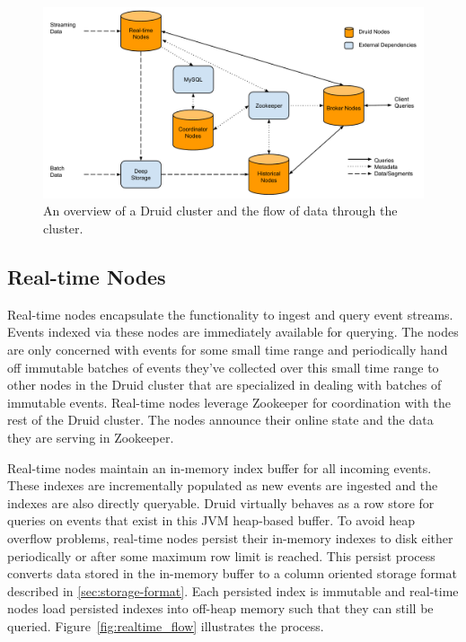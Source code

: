 \documentclass{acm_proc_article-sp}
\begin{document}
\begin{figure}
\centering
\includegraphics[width = 4.5in]{cluster}
\caption{An overview of a Druid cluster and the flow of data through the cluster.}
\label{fig:cluster}
\end{figure}

\subsection{Real-time Nodes}
\label{sec:realtime}
Real-time nodes encapsulate the functionality to ingest and query event
streams. Events indexed via these nodes are immediately available for querying.
The nodes are only concerned with events for some small time range and
periodically hand off immutable batches of events they've collected over this
small time range to other nodes in the Druid cluster that are specialized in
dealing with batches of immutable events. Real-time nodes leverage Zookeeper
\cite{hunt2010zookeeper} for coordination with the rest of the Druid cluster.
The nodes announce their online state and the data they are serving in
Zookeeper. 

Real-time nodes maintain an in-memory index buffer for all incoming events.
These indexes are incrementally populated as new events are ingested and the
indexes are also directly queryable.  Druid virtually behaves as a row store
for queries on events that exist in this JVM heap-based buffer. To avoid heap overflow
problems, real-time nodes persist their in-memory indexes to disk either
periodically or after some maximum row limit is reached. This persist process
converts data stored in the in-memory buffer to a column oriented storage
format described in \ref{sec:storage-format}. Each persisted index is immutable and
real-time nodes load persisted indexes into off-heap memory such that they can
still be queried. Figure~\ref{fig:realtime_flow} illustrates the process.
\end{document}
